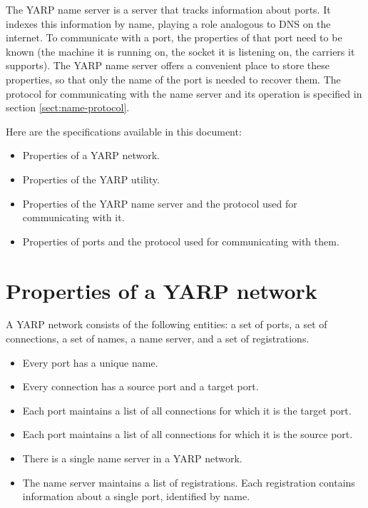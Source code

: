 \documentclass[a4]{article}
\newcommand{\pflist}
  {     \renewcommand{\labelitemi}{$\triangleright$}
        \setlength{\itemsep}{0mm}
        \setlength{\parsep}{0mm}
        \setlength{\partopsep}{0mm}
        \setlength{\topsep}{0mm}
        \setlength{\parskip}{0mm}    }
\begin{document}
The YARP name server is a server that tracks information about ports.
It indexes this information by name, playing a role analogous to
DNS on the internet.
%
To communicate with a port, the properties of that port need to be
known (the machine it is running on, the socket it is listening on,
the carriers it supports).  The YARP name server offers a convenient
place to store these properties, so that only the name of the port is
needed to recover them.
%
The protocol for communicating with the name server
and its operation is specified in section \ref{sect:name-protocol}.

Here are the specifications available in this document:
%
\begin{itemize}

\item Properties of a YARP network.

\item Properties of the YARP utility.

\item Properties of the YARP name server and the protocol used 
for communicating with it.

\item Properties of ports and the protocol used
for communicating with them.

\end{itemize}


\section{Properties of a YARP network}

A YARP network consists of the following entities: a set of
ports, a set of connections, a set of names, a name server, and a set
of registrations.

\begin{itemize} \pflist

\item Every port has a unique name.

\item Every connection has a source port and a target port.

\item Each port maintains a list of all connections for which it
is the target port.

\item Each port maintains a list of all connections for which it
is the source port.

\item There is a single name server in a YARP network.

\item The name server maintains a list of registrations.  Each 
registration contains information about a single port, identified
by name.

\end{itemize}
\end{document}
